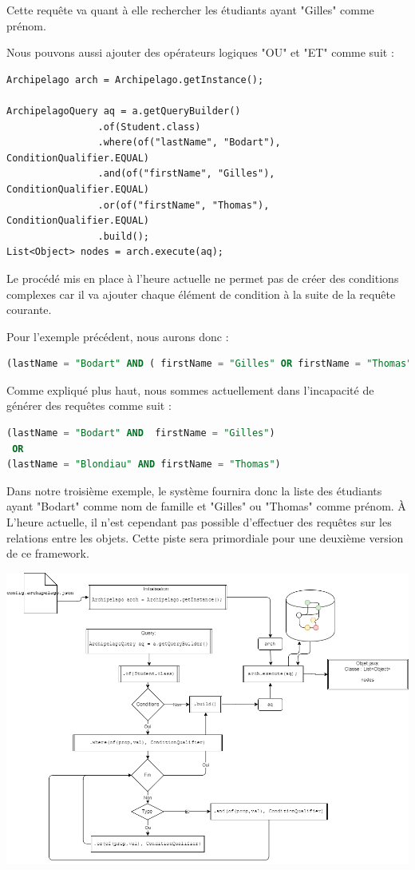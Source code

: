 \documentclass[a4paper,fleqn,12pt]{report}
\begin{document}
Cette requête va quant à elle rechercher les étudiants ayant "Gilles" comme prénom.

Nous pouvons aussi ajouter des opérateurs logiques "OU" et "ET" comme suit :
\begin{lstlisting}
Archipelago arch = Archipelago.getInstance();

ArchipelagoQuery aq = a.getQueryBuilder()
                .of(Student.class)
                .where(of("lastName", "Bodart"), ConditionQualifier.EQUAL)
                .and(of("firstName", "Gilles"), ConditionQualifier.EQUAL)
                .or(of("firstName", "Thomas"), ConditionQualifier.EQUAL)
                .build();
List<Object> nodes = arch.execute(aq);
\end{lstlisting}

Le procédé mis en place à l'heure actuelle ne permet pas de créer des conditions complexes car il va ajouter chaque élément de condition à la suite de la requête courante. 

Pour l'exemple précédent, nous aurons donc : 

\begin{lstlisting}[language=SQL]
(lastName = "Bodart" AND ( firstName = "Gilles" OR firstName = "Thomas"))
\end{lstlisting}

Comme expliqué plus haut, nous sommes actuellement dans l'incapacité de générer des requêtes comme suit :

\begin{lstlisting}[language=SQL]
(lastName = "Bodart" AND  firstName = "Gilles") 
 OR 
(lastName = "Blondiau" AND firstName = "Thomas")
\end{lstlisting}
\label{badCondition}
Dans notre troisième exemple, le système fournira donc la liste des étudiants ayant "Bodart" comme nom de famille et "Gilles" ou "Thomas" comme prénom. \`A L'heure actuelle, il n'est cependant pas possible d'effectuer des requêtes sur les relations entre les objets. Cette piste sera primordiale pour une deuxième version de ce framework.

\begin{center}
\includegraphics[scale=0.4]{figures/query.png}
\label{fig:Query}
\end{center}
\end{document}
